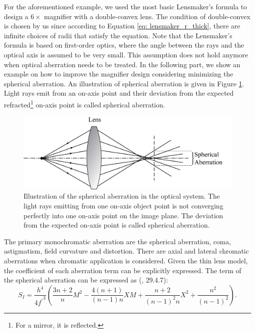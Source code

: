 For the aforementioned example, we used the most basic Lensmaker's formula to design a $6 \times$ magnifier with a double-convex lens.  The condition of double-convex is chosen by us since according to Equation \ref{eq: lensmaker_r_thick}, there are infinite choices of radii that satisfy the equation. Note that the Lensmaker's formula is based on first-order optics, where the angle between the rays and the optical axis is assumed to be very small. This assumption does not hold anymore when optical aberration needs to be treated. In the following part, we show an example on how to improve the magnifier design considering minimizing the spherical aberration. An illustration of spherical aberration is given in Figure \ref{fig: spherical aberration}. Light rays emit from an on-axis point and their deviation from the expected refracted\footnote{For a mirror, it is reflected.} on-axis point is called spherical aberration. 
\begin{figure}
    \centering
    \includegraphics[scale=0.58]{chapter-1/figures/illus_spherical_abe.png}
    \caption{Illustration of the spherical aberration in the optical system. The light rays emitting from one on-axis object point is not converging perfectly into one on-axis point on the image plane. The deviation from the expected on-axis point is called spherical aberration.}
    \label{fig: spherical aberration}
\end{figure} 
The primary monochromatic aberration are the spherical aberration, coma, astigmatism, field curvature and distortion. There are axial and lateral chromatic aberrations when chromatic application is considered. Given the thin lens model, the coefficient of each aberration term can be explicitly expressed. The term of the spherical aberration can be expressed as (\cite{GrossHBOvol1}, 29.4.7):
\begin{equation} \label{eq: Si_spherical}
    S_I = \frac{h^4}{4{f^\prime}^3}\left(\frac{3n+2}{n}M^2 - \frac{4(n+1)}{(n-1)n}XM + \frac{n+2}{(n-1)^2n}X^2 + \frac{n^2}{(n-1)^2}\right).
\end{equation}                            %

